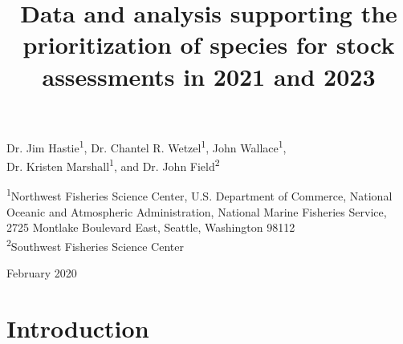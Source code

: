 \documentclass[12pt,]{article}
\title{Data and analysis supporting the prioritization of species for stock
assessments in 2021 and 2023}
\author{}
\date{}
\begin{document}
\maketitle


\begin{center}
\thispagestyle{empty}

\vspace{.5cm}


Dr. Jim Hastie\textsuperscript{1}, Dr. Chantel R. Wetzel\textsuperscript{1}, John Wallace\textsuperscript{1},\\
Dr. Kristen Marshall\textsuperscript{1}, and Dr. John Field\textsuperscript{2}\\


\vspace{.5cm}

\small
\textsuperscript{1}Northwest Fisheries Science Center, U.S. Department of Commerce, National Oceanic and Atmospheric Administration, National Marine Fisheries Service, 2725 Montlake Boulevard East, Seattle, Washington 98112\\

\textsuperscript{2}Southwest Fisheries Science Center\\

\vspace{1.5cm}


\vfill
February 2020

\vspace{1cm}


\vspace{.3cm}

\end{center}

\newpage



\maketitle


\setcounter{page}{1}

{
\setcounter{tocdepth}{4}
\tableofcontents
}
\setlength{\parskip}{5mm plus1mm minus1mm} \pagebreak

\setcounter{page}{1}


\section{Introduction}\label{introduction}
\end{document}
